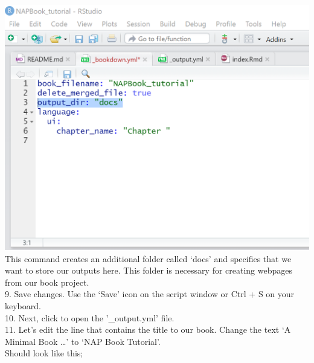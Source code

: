 \documentclass[
]{book}
\begin{document}
\includegraphics{tutorial_screenshots/add_docs_to_bkdnyaml.png}\\
This command creates an additional folder called `docs' and specifies that we want to store our outputs here. This folder is necessary for creating webpages from our book project.\\
9. Save changes. Use the `Save' icon on the script window or Ctrl + S on your keyboard.\\
10. Next, click to open the '\_output.yml' file.\\
11. Let's edit the line that contains the title to our book. Change the text `A Minimal Book \ldots{}' to `NAP Book Tutorial'.\\
Should look like this;
\end{document}
